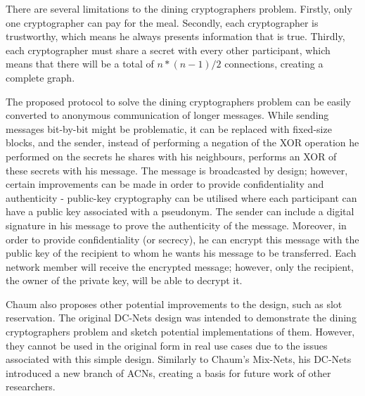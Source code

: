 There are several limitations to the dining cryptographers problem. Firstly, only one cryptographer can pay for the meal. Secondly, each cryptographer is trustworthy, which means he always presents information that is true. Thirdly, each cryptographer must share a secret with every other participant, which means that there will be a total of $n * (n-1) / 2$ connections, creating a complete graph.

The proposed protocol to solve the dining cryptographers problem can be easily converted to anonymous communication of longer messages. While sending messages bit-by-bit might be problematic, it can be replaced with fixed-size blocks, and the sender, instead of performing a negation of the XOR operation he performed on the secrets he shares with his neighbours, performs an XOR of these secrets with his message. The message is broadcasted by design; however, certain improvements can be made in order to provide confidentiality and authenticity - public-key cryptography can be utilised where each participant can have a public key associated with a pseudonym. The sender can include a digital signature in his message to prove the authenticity of the message. Moreover, in order to provide confidentiality (or secrecy), he can encrypt this message with the public key of the recipient to whom he wants his message to be transferred. Each network member will receive the encrypted message; however, only the recipient, the owner of the private key, will be able to decrypt it.

Chaum also proposes other potential improvements to the design, such as slot reservation.
The original DC-Nets design was intended to demonstrate the dining cryptographers problem and sketch potential implementations of them. However, they cannot be used in the original form in real use cases due to the issues associated with this simple design. Similarly to Chaum’s Mix-Nets, his DC-Nets introduced a new branch of ACNs, creating a basis for future work of other researchers.


